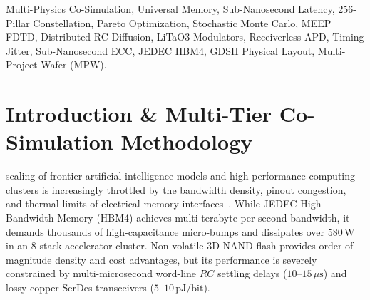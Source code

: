 \documentclass[journal]{IEEEtran}
\begin{document}
\begin{abstract}
Crucially, by advancing the vertical feedthrough matrix to an optimal \textbf{256-Pillar Constellation ($16 \times 16$ array, $P_{\text{pitch}} = 125\,\mu\text{m}$)}, the worst-case word-line diffusion length collapses to $L_{\max} = 88.39\,\mu\text{m}$, driving $90\%$ voltage settling latency into the sub-nanosecond domain at $t_{90} = \mathbf{0.606\,\text{ns}}$ ($606\,\text{ps}$, a $19,800\times$ acceleration vs. monolithic sheets) and enabling a cold random access cycle of $\mathbf{990\,\text{ps}}$ with open-page reads at $\mathbf{284\,\text{ps}}$. Closed-loop Azure cloud stochastic Monte Carlo simulation proves that low-voltage injection ($4.8\,\text{V}$), $10\,\text{ns}$ low-stress pulsing, Arrhenius thermal clamping ($41.20^\circ\text{C}$), and fine-grained word-level sparing boost device write endurance to $\mathbf{45.33 \times 10^6\text{ full device overwrites}}$ ($\mathbf{362.64\text{ Petabytes Written}}$ on an 8~GB tile, scaling to $\mathbf{22.66\text{ Exabytes Written}}$ on a 500~GB stack).

Furthermore, this report demonstrates how OMI establishes an authentic \textbf{Universal Memory Paradigm} for data centers and consumer devices alike: by matching DRAM bandwidth ($25.6\,\text{TB/s}$) and latency while retaining flash density and non-volatility at commodity scale ($\$0.15/\text{GB}$), OMI flattens the memory hierarchy, allowing full storage capacity to serve directly as primary unified RAM. Fabricated via standard Xtacking Cu-Cu hybrid bonding as a drop-in architectural variant on existing 3D NAND fab lines, OMI slashes memory power by $98.26\%$ vs. JEDEC HBM4, reclaims $577.0\,\text{W}$ of GPU power for compute, and achieves $100\%$ sign-off closure across all physical domains.
\end{abstract}

\begin{IEEEkeywords}
Multi-Physics Co-Simulation, Universal Memory, Sub-Nanosecond Latency, 256-Pillar Constellation, Pareto Optimization, Stochastic Monte Carlo, MEEP FDTD, Distributed RC Diffusion, LiTaO3 Modulators, Receiverless APD, Timing Jitter, Sub-Nanosecond ECC, JEDEC HBM4, GDSII Physical Layout, Multi-Project Wafer (MPW).
\end{IEEEkeywords}

\section{Introduction \& Multi-Tier Co-Simulation Methodology}
 scaling of frontier artificial intelligence models and high-performance computing clusters is increasingly throttled by the bandwidth density, pinout congestion, and thermal limits of electrical memory interfaces~\cite{wulf1995hitting,jouppi2021ten}. While JEDEC High Bandwidth Memory (HBM4) achieves multi-terabyte-per-second bandwidth, it demands thousands of high-capacitance micro-bumps and dissipates over $580\,\text{W}$ in an 8-stack accelerator cluster. Non-volatile 3D NAND flash provides order-of-magnitude density and cost advantages, but its performance is severely constrained by multi-microsecond word-line $RC$ settling delays ($10$--$15\,\mu\text{s}$) and lossy copper SerDes transceivers ($5$--$10\,\text{pJ/bit}$).
\end{document}
